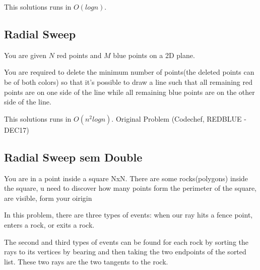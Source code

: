             This solutions runs in $O(logn)$.
            
            
        
        
        \subsection{Radial Sweep}
        You are given $N$ red points and $M$ blue points on a 2D plane.

        You are required to delete the minimum number of points(the deleted points can be of both colors) so that it's possible to draw a line such that all remaining red points are on one side of the line while all remaining blue points are on the other side of the line.
        
        This solutions runs in $O(n^2logn)$. Original Problem (Codechef, REDBLUE - DEC17)
        
        
        \subsection{Radial Sweep sem Double}
        You are in a point inside a square NxN. There are some rocks(polygons) inside the square, u need to discover how many points form the perimeter of the square, are visible, form your oirigin
    
        In this problem, there are three types of events: when our ray hits a fence point, enters a rock, or exits a rock.

    The second and third types of events can be found for each rock by sorting the rays to its vertices by bearing and then taking the two endpoints of the sorted list. These two rays are the two tangents to the rock.
    
